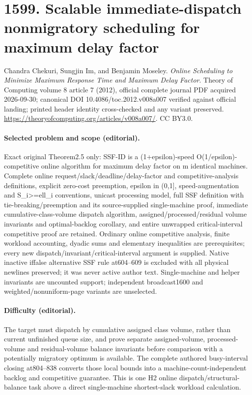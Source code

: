 \documentclass[10pt]{article}
\theoremstyle{definition}
\numberwithin{equation}{section}
\begin{document}
\begingroup\raggedright
\section*{1599. Scalable immediate-dispatch nonmigratory scheduling for maximum delay factor}
Chandra Chekuri, Sungjin Im, and Benjamin Moseley. \emph{Online Scheduling to Minimize Maximum Response Time and Maximum Delay Factor}. Theory of Computing volume 8 article 7 (2012), official complete journal PDF acquired 2026-09-30; canonical DOI 10.4086/toc.2012.v008a007 verified against official landing; printed header identity cross-checked and any variant preserved. \url{https://theoryofcomputing.org/articles/v008a007/}. CC BY3.0.
\paragraph{Selected problem and scope (editorial).} Exact original Theorem2.5 only: SSF-ID is a (1+epsilon)-speed O(1/epsilon)-competitive online algorithm for maximum delay factor on m identical machines. Complete online request/slack/deadline/delay-factor and competitive-analysis definitions, explicit zero-cost preemption, epsilon in (0,1], speed-augmentation and S\_i>=ell\_i conventions, unicast processing model, full SSF definition with tie-breaking/preemption and its source-supplied single-machine proof, immediate cumulative-class-volume dispatch algorithm, assigned/processed/residual volume invariants and optimal-backlog corollary, and entire unwrapped critical-interval competitive proof are retained. Ordinary online competitive analysis, finite workload accounting, dyadic sums and elementary inequalities are prerequisites; every new dispatch/invariant/critical-interval argument is supplied. Native inactive iffalse alternative SSF rule at604–609 is excluded with all physical newlines preserved; it was never active author text. Single-machine and helper invariants are uncounted support; independent broadcast1600 and weighted/nonuniform-page variants are unselected.
\paragraph{Difficulty (editorial).} The target must dispatch by cumulative assigned class volume, rather than current unfinished queue size, and prove separate assigned-volume, processed-volume and residual-volume balance invariants before comparison with a potentially migratory optimum is available. The complete authored busy-interval closing at804–838 converts those local bounds into a machine-count-independent backlog and competitive guarantee. This is one H2 online dispatch/structural-balance task above a direct single-machine shortest-slack workload calculation.
\end{document}
